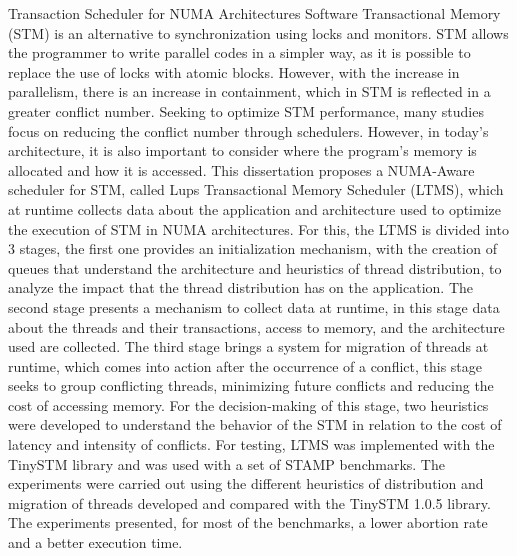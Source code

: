\documentclass[diss,capa]{texufpel}
\begin{document}
\begin{englishabstract}{Transaction Scheduler for NUMA Architectures}
Software Transactional Memory (STM) is an alternative to synchronization using locks and monitors. STM allows the programmer to write parallel codes in a simpler way, as it is possible to replace the use of locks with atomic blocks. However, with the increase in parallelism, there is an increase in containment, which in STM is reflected in a greater conflict number. Seeking to optimize STM performance, many studies focus on reducing the conflict number through schedulers. However, in today's architecture, it is also important to consider where the program's memory is allocated and how it is accessed. This dissertation proposes a NUMA-Aware scheduler for STM, called Lups Transactional Memory Scheduler (LTMS), which at runtime collects data about the application and architecture used to optimize the execution of STM in NUMA architectures. For this, the LTMS is divided into 3 stages, the first one provides an initialization mechanism, with the creation of queues that understand the architecture and heuristics of thread distribution, to analyze the impact that the thread distribution has on the application. The second stage presents a mechanism to collect data at runtime, in this stage data about the threads and their transactions, access to memory, and the architecture used are collected. The third stage brings a system for migration of threads at runtime, which comes into action after the occurrence of a conflict, this stage seeks to group conflicting threads, minimizing future conflicts and reducing the cost of accessing memory. For the decision-making of this stage, two heuristics were developed to understand the behavior of the STM in relation to the cost of latency and intensity of conflicts. For testing, LTMS was implemented with the TinySTM library and was used with a set of STAMP benchmarks. The experiments were carried out using the different heuristics of distribution and migration of threads developed and compared with the TinySTM 1.0.5 library. The experiments presented, for most of the benchmarks, a lower abortion rate and a better execution time.
\end{englishabstract}

\listoffigures

\listoftables
\end{document}
